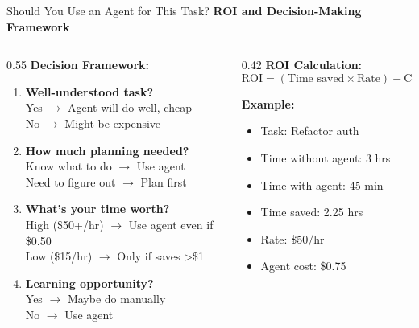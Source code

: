 \documentclass[aspectratio=169,11pt]{beamer}
\begin{document}
\begin{frame}{Should You Use an Agent for This Task?}
    \textbf{ROI and Decision-Making Framework}

    \begin{columns}[T]
        \begin{column}{0.55\textwidth}
            \textbf{Decision Framework:}
            \begin{enumerate}
                \item \textbf{Well-understood task?}\\
                Yes $\rightarrow$ Agent will do well, cheap\\
                No $\rightarrow$ Might be expensive

                \item \textbf{How much planning needed?}\\
                Know what to do $\rightarrow$ Use agent\\
                Need to figure out $\rightarrow$ Plan first

                \item \textbf{What's your time worth?}\\
                High (\$50+/hr) $\rightarrow$ Use agent even if \$0.50\\
                Low (\$15/hr) $\rightarrow$ Only if saves >\$1

                \item \textbf{Learning opportunity?}\\
                Yes $\rightarrow$ Maybe do manually\\
                No $\rightarrow$ Use agent
            \end{enumerate}
        \end{column}
        \begin{column}{0.42\textwidth}
            \textbf{ROI Calculation:}
            \[
            \text{ROI} = (\text{Time saved} \times \text{Rate}) - \text{Cost}
            \]

            \textbf{Example:}
            \begin{itemize}
                \item Task: Refactor auth
                \item Time without agent: 3 hrs
                \item Time with agent: 45 min
                \item Time saved: 2.25 hrs
                \item Rate: \$50/hr
                \item Agent cost: \$0.75
            \end{itemize}


\end{column}
\end{columns}
\end{frame}
\end{document}
